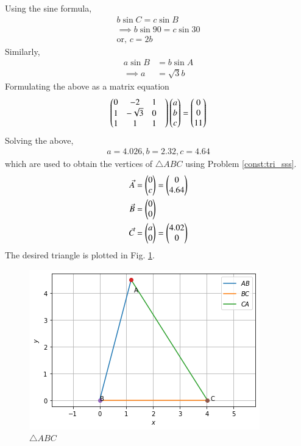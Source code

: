 Using the sine formula, 
\begin{align}
 b\sin{C}=c\sin{B}
\\
\implies b\sin{90}=c\sin{30}
\\
\text{or, } c=2b
\end{align}
Similarly, 
\begin{align}
a\sin{B}&=b\sin{A}
\\
\implies a&=\sqrt{3}b
\end{align}
Formulating the above as a  matrix equation
\begin{align}
\begin{pmatrix}0 & -2 & 1 \\1& -\sqrt{3}& 0 \\1& 1& 1&\end{pmatrix}\begin{pmatrix}a\\b\\c\end{pmatrix} = \begin{pmatrix}0\\0\\11\end{pmatrix}
\end{align}
Solving the above, 
\begin{align}
 a=4.026, b=2.32, c=4.64
\end{align} 
which are used to obtain the vertices
 of $\triangle ABC$ using Problem \ref{const:tri_sss}.  
\begin{align}
    \Vec{A}&=\begin{pmatrix}0\\c\end{pmatrix}=\begin{pmatrix}0\\4.64\end{pmatrix}\\\Vec{B}&=\begin{pmatrix}0\\0\end{pmatrix}\\\Vec{C}&=\begin{pmatrix}a\\0\end{pmatrix}=\begin{pmatrix}4.02\\0\end{pmatrix}
\end{align}
The desired triangle is plotted in Fig. \ref{constr/9/fig:ABC}.
\begin{figure}[h!]
\centering
\includegraphics[width=\columnwidth]{solutions/9/figures/Figure11.png}
\caption{$\triangle ABC$}
\label{constr/9/fig:ABC}
\end{figure}
